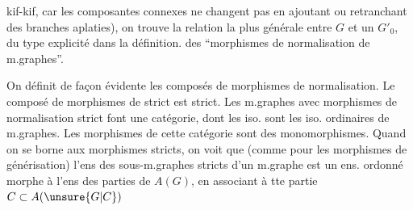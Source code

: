 kif-kif, car les composantes connexes ne changent pas en ajoutant ou retranchant des branches aplaties), on trouve la relation la plus générale entre $G$ et un $G'_0$, du type explicité dans la définition. des ``morphismes de normalisation de m.graphes''.

On définit de façon évidente les composés de morphismes de normalisation. Le composé de morphismes de  strict est strict. Les m.graphes avec morphismes de normalisation strict font une catégorie, dont les iso. sont les iso. ordinaires de m.graphes. Les morphismes de cette catégorie sont des monomorphismes. Quand on se borne aux morphismes  stricts, on voit que (comme pour les morphismes de générisation) l'ens des sous-m.graphes stricts d'un m.graphe  est un ens. ordonné morphe à l'ens des parties de $A(G)$, en associant à tte partie $C\subset A(\unsure{G|C})$
